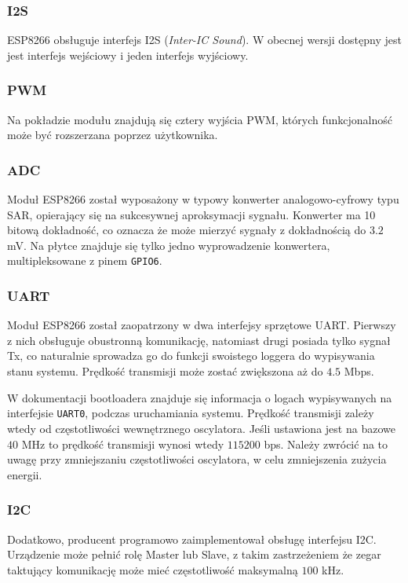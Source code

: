 \subsubsection{I2S}
\label{i2s}
ESP8266 obsługuje interfejs I2S (\textit{Inter-IC Sound}). W obecnej wersji dostępny
jest jest interfejs wejściowy i jeden interfejs wyjściowy.

\subsubsection{PWM}
\label{pwm}
Na pokładzie modułu znajdują się cztery wyjścia PWM, których funkcjonalność może
być rozszerzana poprzez użytkownika.

\subsubsection{ADC}
Moduł ESP8266 został wyposażony w typowy konwerter analogowo-cyfrowy typu SAR, opierający
się na sukcesywnej aproksymacji sygnału. Konwerter ma 10 bitową dokładność, co oznacza
że może mierzyć sygnały z dokładnością do $\num{3.2}$ \si{mV}. Na płytce znajduje się
tylko jedno wyprowadzenie konwertera, multipleksowane z pinem \verb+GPIO6+.

\subsubsection{UART}
Moduł ESP8266 został zaopatrzony w dwa interfejsy sprzętowe UART. Pierwszy z nich
obsługuje obustronną komunikację, natomiast drugi posiada tylko sygnał Tx, co naturalnie
sprowadza go do funkcji swoistego loggera do wypisywania stanu systemu. Prędkość transmisji
może zostać zwiększona aż do $\num{4.5}$ Mbps. 

W dokumentacji bootloadera znajduje się informacja o logach wypisywanych 
na interfejsie \verb+UART0+, podczas uruchamiania systemu. 
Prędkość transmisji zależy wtedy od częstotliwości
wewnętrznego oscylatora. Jeśli ustawiona jest na bazowe $\num{40}$ \si{MHz} to 
prędkość transmisji wynosi wtedy $\num{115200}$ bps. Należy zwrócić na to uwagę
przy zmniejszaniu częstotliwości oscylatora, w celu zmniejszenia zużycia energii.

\subsubsection{I2C}
Dodatkowo, producent programowo zaimplementował obsługę interfejsu I2C. 
Urządzenie może pełnić rolę Master lub Slave, z takim zastrzeżeniem że zegar
taktujący komunikację może mieć częstotliwość maksymalną $\num{100}$ \si{kHz}.\\
